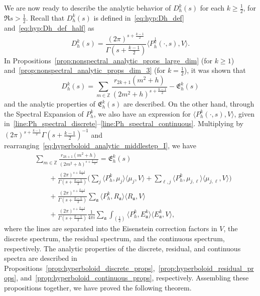 We are now ready to describe the analytic behavior of $D_h^k(s)$ for each $k \geq
\frac{1}{2}$, for $\Re s > \frac{1}{2}$.
Recall that $D_h^k(s)$ is defined in~\eqref{eq:hyp:Dh_def} and~\eqref{eq:hyp:Dh_def_half}
as
\begin{equation}
  D_h^k(s) = \frac{(2\pi)^{s + \frac{k-1}{2}}}{\Gamma(s + \frac{k-1}{2})} \langle
  P_h^{\frac{1}{2}}(\cdot, s), V \rangle.
\end{equation}
In Propositions~\ref{prop:nonspectral_analytic_props_large_dim} (for $k \geq 1$)
and~\ref{prop:nonspectral_analytic_props_dim_3} (for $k = \frac{1}{2}$), it was shown that
\begin{equation}\label{eq:hyperboloid_analytic_middlestep_I}
  D_h^k(s) = \sum_{m \in \mathbb{Z}} \frac{r_{2k+1}(m^2 + h)}{(2m^2 + h)^{s +
  \frac{k-1}{2}}} - \mathfrak{E}_h^k(s)
\end{equation}
and the analytic properties of $\mathfrak{E}_h^k(s)$ are described.
On the other hand, through the Spectral Expansion of $P_h^k$, we also have an expression
for $\langle P_h^k(\cdot, s), V \rangle$, given
in~\eqref{line:Ph_spectral_discrete}--\eqref{line:Ph_spectral_continuous}.
Multiplying by $(2\pi)^{s + \frac{k-1}{2}} \Gamma(s + \frac{k-1}{2})^{-1}$ and
rearranging~\eqref{eq:hyperboloid_analytic_middlestep_I}, we have
\begin{equation}\label{eq:hyperboloid_dirichlet_decomposition}
  \begin{split}
    &\sum_{m \in \mathbb{Z}} \frac{r_{2k+1}(m^2 + h)}{(2m^2 + h)^{s + \frac{k-1}{2}}} =
    \mathfrak{E}_h^k(s) \\
    &\qquad + \frac{(2\pi)^{s + \frac{k-1}{2}}}{\Gamma(s + \frac{k-1}{2})} \bigg( \sum_j
  \langle P_h^k, \mu_j \rangle \langle \mu_j, V \rangle + \sum_{\ell,j} \langle P_h^k,
\mu_{j,\ell} \rangle \langle \mu_{j, \ell}, V \rangle \bigg) \\
    &\qquad + \frac{(2\pi)^{s + \frac{k-1}{2}}}{\Gamma(s + \frac{k-1}{2})}
\sum_\mathfrak{a} \langle P_h^k, R_\mathfrak{a}\rangle \langle R_\mathfrak{a}, V \rangle
\\
    &\qquad + \frac{(2\pi)^{s + \frac{k-1}{2}}}{\Gamma(s + \frac{k-1}{2})} \frac{1}{4\pi
i} \sum_{\mathfrak{a}} \int_{(\frac{1}{2})} \langle P_h^k, E_\mathfrak{a}^k\rangle \langle
E_\mathfrak{a}^k, V\rangle,
  \end{split}
\end{equation}
where the lines are separated into the Eisenstein correction factors in $V$, the discrete
spectrum, the residual spectrum, and the continuous spectrum, respectively.
The analytic properties of the discrete, residual, and continuous spectra are described in
Propositions~\ref{prop:hyperboloid_discrete_props},~\ref{prop:hyperboloid_residual_props},
and~\ref{prop:hyperboloid_continuous_props}, respectively.
Assembling these propositions together, we have proved the following theorem.


